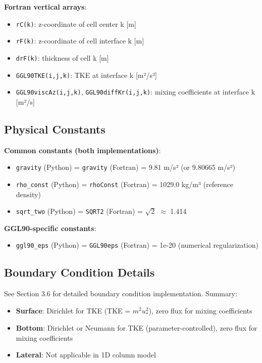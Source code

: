 \documentclass[11pt]{article}
\begin{document}
\textbf{Fortran vertical arrays}:
\begin{itemize}
    \item \verb|rC(k)|: z-coordinate of cell center k [m]
    \item \verb|rF(k)|: z-coordinate of cell interface k [m]
    \item \verb|drF(k)|: thickness of cell k [m]
    \item \verb|GGL90TKE(i,j,k)|: TKE at interface k [m²/s²]
    \item \verb|GGL90viscAz(i,j,k)|, \verb|GGL90diffKr(i,j,k)|: mixing coefficients at interface k [m²/s]
\end{itemize}

\subsection{Physical Constants}

\textbf{Common constants (both implementations)}:
\begin{itemize}
    \item \verb|gravity| (Python) = \verb|gravity| (Fortran) = 9.81 m/s² (or 9.80665 m/s²)
    \item \verb|rho_const| (Python) = \verb|rhoConst| (Fortran) = 1029.0 kg/m³ (reference density)
    \item \verb|sqrt_two| (Python) = \verb|SQRT2| (Fortran) = $\sqrt{2}$ $\approx$ 1.414
\end{itemize}

\textbf{GGL90-specific constants}:
\begin{itemize}
    \item \verb|ggl90_eps| (Python) = \verb|GGL90eps| (Fortran) = 1e-20 (numerical regularization)
\end{itemize}

\subsection{Boundary Condition Details}

See Section 3.6 for detailed boundary condition implementation. Summary:

\begin{itemize}
    \item \textbf{Surface}: Dirichlet for TKE (TKE = $m^2 u_*^2$), zero flux for mixing coefficients
    \item \textbf{Bottom}: Dirichlet or Neumann for TKE (parameter-controlled), zero flux for mixing coefficients
    \item \textbf{Lateral}: Not applicable in 1D column model
\end{itemize}
\end{document}
